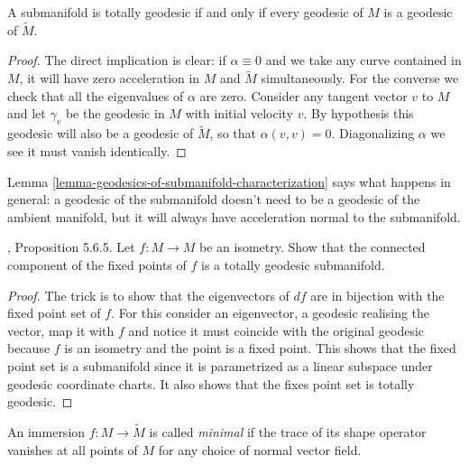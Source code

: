 \begin{lemma}
\label{lemma-totally-geodesic-submanifold}
A submanifold is totally geodesic if and only if every geodesic of $M$ is a
geodesic of $\tilde{M}$.
\end{lemma}

\begin{proof}
The direct implication is clear: if $\alpha \equiv 0$ and we take any curve
contained in $M$, it will have zero acceleration in $M$ and $\tilde{M}$
simultaneously. For the converse we check that all the eigenvalues
of $\alpha$ are zero. Consider any tangent vector $v$ to $M$ and let $\gamma_v$
be the geodesic in $M$ with initial velocity $v$. By hypothesis this geodesic
will also be a geodesic of $\tilde{M}$, so that $\alpha(v,v)=0$. Diagonalizing
$\alpha$ we see it must vanish identically.
\end{proof}

Lemma \ref{lemma-geodesics-of-submanifold-characterization} says what happens in
general: a geodesic of the submanifold doesn't need to be a geodesic of the
ambient manifold, but it will always have acceleration normal to the
submanifold.

\begin{exercise}
\label{exercise-fixed-point-set-of-isometry-is-totally-geodesic-submanifold}
\cite{pet}, Proposition 5.6.5. Let $f:M\to M$ be an isometry. Show that the
connected component of the fixed points of $f$ is a totally geodesic
submanifold.
\end{exercise}

\begin{proof}
The trick is to show that the eigenvectors of $df$ are in bijection with the
fixed point set of $f$. For this consider an eigenvector, a geodesic realising 
the vector, map it with $f$ and notice it must coincide with the original 
geodesic because $f$ is an isometry and the point is a fixed point. This shows
that the fixed point set is a submanifold since it is parametrized as a linear
subspace under geodesic coordinate charts. It also shows that the fixes point
set is totally geodesic.
\end{proof}

\begin{definition}
\label{definition-minimal-immersion}
An immersion $f:M\to\tilde{M}$ is called {\it minimal} if the trace of its shape
operator vanishes at all points of $M$ for any choice of normal vector field.
\end{definition}

